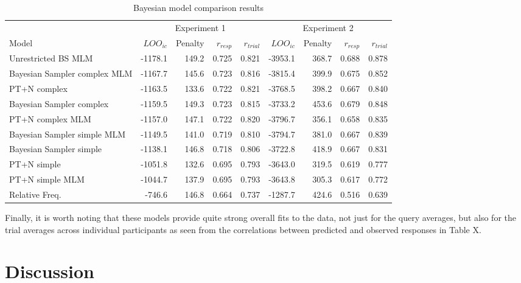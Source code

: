 \documentclass{article}
\begin{document}
\begin{table}

\caption{\label{tab:table2}Bayesian model comparison results}
\centering
\begin{tabular}[t]{lrrrrrrrr}
\toprule
\multicolumn{1}{c}{ } & \multicolumn{4}{c}{Experiment 1} & \multicolumn{4}{c}{Experiment 2} \\
\cmidrule(l{3pt}r{3pt}){2-5} \cmidrule(l{3pt}r{3pt}){6-9}
Model & $LOO_{ic}$ & Penalty & $r_{resp}$ & $r_{trial}$ & $LOO_{ic}$ & Penalty & $r_{resp}$ & $r_{trial}$\\
\midrule
Unrestricted BS MLM & -1178.1 & 149.2 & 0.725 & 0.821 & -3953.1 & 368.7 & 0.688 & 0.878\\
Bayesian Sampler complex MLM & -1167.7 & 145.6 & 0.723 & 0.816 & -3815.4 & 399.9 & 0.675 & 0.852\\
PT+N complex & -1163.5 & 133.6 & 0.722 & 0.821 & -3768.5 & 398.2 & 0.667 & 0.840\\
Bayesian Sampler complex & -1159.5 & 149.3 & 0.723 & 0.815 & -3733.2 & 453.6 & 0.679 & 0.848\\
PT+N complex MLM & -1157.0 & 147.1 & 0.722 & 0.820 & -3796.7 & 356.1 & 0.658 & 0.835\\
\addlinespace
Bayesian Sampler simple MLM & -1149.5 & 141.0 & 0.719 & 0.810 & -3794.7 & 381.0 & 0.667 & 0.839\\
Bayesian Sampler simple & -1138.1 & 146.8 & 0.718 & 0.806 & -3722.8 & 418.9 & 0.667 & 0.831\\
PT+N simple & -1051.8 & 132.6 & 0.695 & 0.793 & -3643.0 & 319.5 & 0.619 & 0.777\\
PT+N simple MLM & -1044.7 & 137.9 & 0.695 & 0.793 & -3643.8 & 305.3 & 0.617 & 0.772\\
Relative Freq. & -746.6 & 146.8 & 0.664 & 0.737 & -1287.7 & 424.6 & 0.516 & 0.639\\
\bottomrule
\end{tabular}
\end{table}

Finally, it is worth noting that these models provide quite strong
overall fits to the data, not just for the query averages, but also for
the trial averages across individual participants as seen from the
correlations between predicted and observed responses in Table X.

\hypertarget{discussion}{%
\section{Discussion}\label{discussion}}
\end{document}
